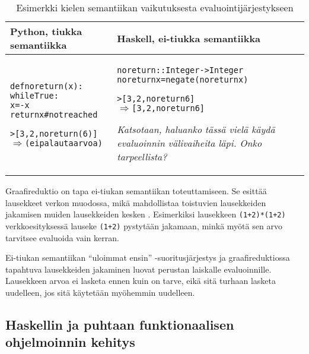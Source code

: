 \makeatletter
\preto{\@verbatim}{\topsep=0pt \partopsep=0pt }
\makeatother
\newpage
\begin{table}[th]
  \begin{center}
    \begin{tabular}{|p{}|p{}|}
      \hline
       Python, tiukka semantiikka& Haskell, ei-tiukka semantiikka \\
      \hline
      \footnotesize

      \begin{alltt}
def noreturn(x):
    while True:
        x = -x
    return x # not reached

> [3, 2, noreturn(6)]
\(\Rightarrow\) (ei palauta arvoa)
    \end{alltt}
      &\footnotesize\begin{alltt}
noreturn :: Integer -> Integer
noreturn x = negate (noreturn x)

> [3, 2, noreturn 6]
\(\Rightarrow\) [3, 2, noreturn 6]

\end{alltt}

      \textit{Katsotaan, haluanko tässä vielä käydä evaluoinnin välivaiheita läpi. Onko tarpeellista?}\\
      \hline
    \end{tabular}
    \caption{Esimerkki kielen semantiikan vaikutuksesta evaluointijärjestykseen }
    \label{table:python_haskell_semantics}
  \end{center}
\end{table}

Graafireduktio on tapa ei-tiukan semantiikan toteuttamiseen. Se esittää lausekkeet verkon muodossa, mikä mahdollistaa toistuvien lausekkeiden jakamisen muiden lausekkeiden kesken \citep{hudak1989conception}. Esimerkiksi lausekkeen \verb!(1+2)*(1+2)! verkkoesityksessä lauseke \verb!(1+2)! pystytään jakamaan, minkä myötä sen arvo tarvitsee evaluoida vain kerran. %

Ei-tiukan semantiikan ``uloimmat ensin'' -suoritusjärjestys ja graafireduktiossa tapahtuva lausekkeiden jakaminen luovat perustan laiskalle evaluoinnille. Lausekkeen arvoa ei lasketa ennen kuin on tarve, eikä sitä turhaan lasketa uudelleen, jos sitä käytetään myöhemmin uudelleen.

\subsection{Haskellin ja puhtaan funktionaalisen ohjelmoinnin kehitys}

